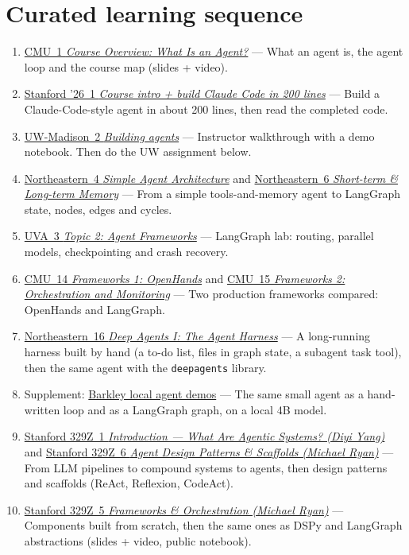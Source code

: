 \documentclass[10pt,oneside]{report}
\begin{document}
\section{Curated learning sequence}
\begin{enumerate}
\item \hyperlink{lec-CMU-1}{CMU~1 \emph{Course Overview: What Is an Agent?}} --- What an agent is, the agent loop and the course map (slides + video).
\item \hyperlink{lec-STAN26-1}{Stanford '26~1 \emph{Course intro + build Claude Code in 200 lines}} --- Build a Claude-Code-style agent in about 200 lines, then read the completed code.
\item \hyperlink{lec-UW-2}{UW-Madison~2 \emph{Building agents}} --- Instructor walkthrough with a demo notebook. Then do the UW assignment below.
\item \hyperlink{lec-NEU-4}{Northeastern~4 \emph{Simple Agent Architecture}} and \hyperlink{lec-NEU-6}{Northeastern~6 \emph{Short-term \& Long-term Memory}} --- From a simple tools-and-memory agent to LangGraph state, nodes, edges and cycles.
\item \hyperlink{lec-UVA-3}{UVA~3 \emph{Topic 2: Agent Frameworks}} --- LangGraph lab: routing, parallel models, checkpointing and crash recovery.
\item \hyperlink{lec-CMU-14}{CMU~14 \emph{Frameworks 1: OpenHands}} and \hyperlink{lec-CMU-15}{CMU~15 \emph{Frameworks 2: Orchestration and Monitoring}} --- Two production frameworks compared: OpenHands and LangGraph.
\item \hyperlink{lec-NEU-16}{Northeastern~16 \emph{Deep Agents I: The Agent Harness}} --- A long-running harness built by hand (a to-do list, files in graph state, a subagent task tool), then the same agent with the \texttt{deepagents} library.
\item Supplement: \hyperref[sup-barkley]{Barkley local agent demos} --- The same small agent as a hand-written loop and as a LangGraph graph, on a local 4B model.
\item \hyperlink{lec-S329Z-1}{Stanford 329Z~1 \emph{Introduction --- What Are Agentic Systems? (Diyi Yang)}} and \hyperlink{lec-S329Z-6}{Stanford 329Z~6 \emph{Agent Design Patterns \& Scaffolds (Michael Ryan)}} --- From LLM pipelines to compound systems to agents, then design patterns and scaffolds (ReAct, Reflexion, CodeAct).
\item \hyperlink{lec-S329Z-5}{Stanford 329Z~5 \emph{Frameworks \& Orchestration (Michael Ryan)}} --- Components built from scratch, then the same ones as DSPy and LangGraph abstractions (slides + video, public notebook).
\end{enumerate}
\end{document}
